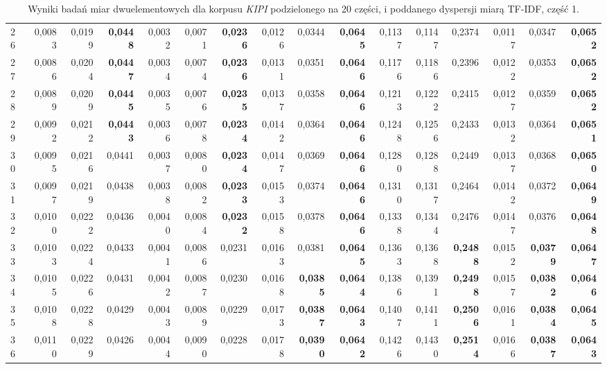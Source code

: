\begin{table}[htp!]
\begin{adjustwidth}{-2cm}{}
\begin{tabular}{ l | *{15}{| r}}
26	&	0,0083	&	0,0199	&	\textbf{0,0448}	&	0,0032	&	0,0071	&	\textbf{0,0236}	&	0,0126	&	0,0344	&	\textbf{0,0645}	&	0,1137	&	0,1147	&	0,2374	&	0,0117	&	0,0347	&	\textbf{0,0652}	\\
27	&	0,0086	&	0,0204	&	\textbf{0,0447}	&	0,0034	&	0,0074	&	\textbf{0,0236}	&	0,0131	&	0,0351	&	\textbf{0,0646}	&	0,1176	&	0,1186	&	0,2396	&	0,0122	&	0,0353	&	\textbf{0,0652}	\\
28	&	0,0089	&	0,0209	&	\textbf{0,0445}	&	0,0035	&	0,0076	&	\textbf{0,0235}	&	0,0137	&	0,0358	&	\textbf{0,0646}	&	0,1213	&	0,1222	&	0,2415	&	0,0127	&	0,0359	&	\textbf{0,0652}	\\
29	&	0,0092	&	0,0212	&	\textbf{0,0443}	&	0,0036	&	0,0078	&	\textbf{0,0234}	&	0,0142	&	0,0364	&	\textbf{0,0646}	&	0,1248	&	0,1256	&	0,2433	&	0,0132	&	0,0364	&	\textbf{0,0651}	\\
30	&	0,0095	&	0,0216	&	0,0441	&	0,0037	&	0,0080	&	\textbf{0,0234}	&	0,0147	&	0,0369	&	\textbf{0,0646}	&	0,1280	&	0,1288	&	0,2449	&	0,0137	&	0,0368	&	\textbf{0,0650}	\\
31	&	0,0097	&	0,0219	&	0,0438	&	0,0038	&	0,0082	&	\textbf{0,0233}	&	0,0153	&	0,0374	&	\textbf{0,0646}	&	0,1310	&	0,1317	&	0,2464	&	0,0142	&	0,0372	&	\textbf{0,0649}	\\
32	&	0,0100	&	0,0222	&	0,0436	&	0,0040	&	0,0084	&	\textbf{0,0232}	&	0,0158	&	0,0378	&	\textbf{0,0646}	&	0,1338	&	0,1344	&	0,2476	&	0,0147	&	0,0376	&	\textbf{0,0648}	\\
33	&	0,0103	&	0,0224	&	0,0433	&	0,0041	&	0,0086	&	0,0231	&	0,0163	&	0,0381	&	\textbf{0,0645}	&	0,1363	&	0,1368	&	\textbf{0,2488}	&	0,0152	&	\textbf{0,0379}	&	\textbf{0,0647}	\\
34	&	0,0105	&	0,0226	&	0,0431	&	0,0042	&	0,0087	&	0,0230	&	0,0168	&	\textbf{0,0385}	&	\textbf{0,0644}	&	0,1386	&	0,1391	&	\textbf{0,2498}	&	0,0157	&	\textbf{0,0382}	&	\textbf{0,0646}	\\
35	&	0,0108	&	0,0228	&	0,0429	&	0,0043	&	0,0089	&	0,0229	&	0,0173	&	\textbf{0,0387}	&	\textbf{0,0643}	&	0,1407	&	0,1411	&	\textbf{0,2506}	&	0,0161	&	\textbf{0,0384}	&	\textbf{0,0645}	\\
36	&	0,0110	&	0,0229	&	0,0426	&	0,0044	&	0,0090	&	0,0228	&	0,0178	&	\textbf{0,0390}	&	\textbf{0,0642}	&	0,1426	&	0,1430	&	\textbf{0,2514}	&	0,0166	&	\textbf{0,0387}	&	\textbf{0,0643}	\\
	\bottomrule
\end{tabular}
 \end{adjustwidth}
\caption[Wyniki badań miar dwuelementowych dla korpusu \emph{KIPI} podzielonego na 20 części, i poddanego dyspersji miarą TF-IDF, część 1]{Wyniki badań miar dwuelementowych dla korpusu \emph{KIPI} podzielonego na 20 części, i poddanego dyspersji miarą TF-IDF, część 1.}
\label{KIPI_TFIDF_20_part_1}
\end{table}

